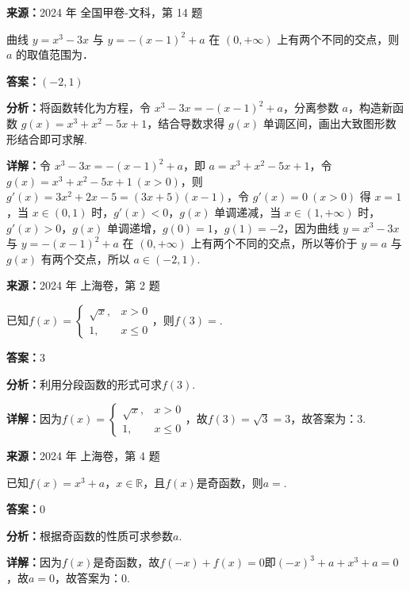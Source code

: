 \begin{question}[points=5]
\textbf{来源：}2024 年 全国甲卷-文科，第 14 题\par
曲线 $y = x^3 - 3x$ 与 $y = -(x-1)^2 + a$ 在 $(0, +\infty)$ 上有两个不同的交点，则 $a$ 的取值范围为．
\fillin[{$(-2, 1)$}]
\begin{solution}
\textbf{答案：}$(-2, 1)$

\textbf{分析：}将函数转化为方程，令 $x^3 - 3x = -(x-1)^2 + a$，分离参数 $a$，构造新函数 $g(x) = x^3 + x^2 - 5x + 1$，结合导数求得 $g(x)$ 单调区间，画出大致图形数形结合即可求解.

\textbf{详解：}令 $x^3 - 3x = -(x-1)^2 + a$，即 $a = x^3 + x^2 - 5x + 1$，令 $g(x) = x^3 + x^2 - 5x + 1 \ (x > 0)$，则 $g'(x) = 3x^2 + 2x - 5 = (3x+5)(x-1)$，令 $g'(x) = 0 \ (x > 0)$ 得 $x = 1$，当 $x \in (0,1)$ 时，$g'(x) < 0$，$g(x)$ 单调递减，当 $x \in (1, +\infty)$ 时，$g'(x) > 0$，$g(x)$ 单调递增，$g(0) = 1$，$g(1) = -2$，因为曲线 $y = x^3 - 3x$ 与 $y = -(x-1)^2 + a$ 在 $(0, +\infty)$ 上有两个不同的交点，所以等价于 $y = a$ 与 $g(x)$ 有两个交点，所以 $a \in (-2, 1)$.
\end{solution}
\end{question}

\begin{question}[points=4]
\textbf{来源：}2024 年 上海卷，第 2 题\par
已知$f(x)=\begin{cases} \sqrt{x}, & x>0 \\ 1, & x\le 0 \end{cases}$，则$f(3)=$.
\fillin[{$3$}]
\begin{solution}
\textbf{答案：}$3$

\textbf{分析：}利用分段函数的形式可求$f(3)$.

\textbf{详解：}因为$f(x)=\begin{cases} \sqrt{x}, & x>0 \\ 1, & x\le 0 \end{cases}$，故$f(3)=\sqrt{3}=3$，故答案为：$3$.
\end{solution}
\end{question}

\begin{question}[points=4]
\textbf{来源：}2024 年 上海卷，第 4 题\par
已知$f(x)=x^3+a$，$x\in\mathbb{R}$，且$f(x)$是奇函数，则$a=$.
\fillin[{$0$}]
\begin{solution}
\textbf{答案：}$0$

\textbf{分析：}根据奇函数的性质可求参数$a$.

\textbf{详解：}因为$f(x)$是奇函数，故$f(-x)+f(x)=0$即$(-x)^3+a+x^3+a=0$，故$a=0$，故答案为：$0$.
\end{solution}
\end{question}

